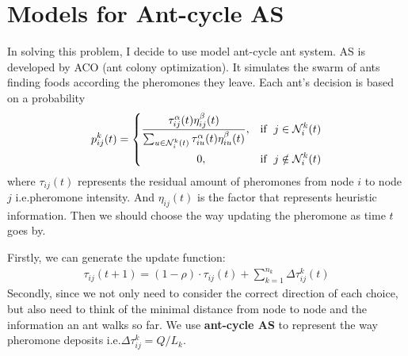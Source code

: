 \documentclass{article}
\begin{document}
\section{Models for Ant-cycle AS}
In solving this problem, I decide to use model ant-cycle ant system.
AS is developed by ACO (ant colony optimization).
It simulates the swarm of ants finding foods according the pheromones they leave.
Each ant's decision is based on a probability
\[p_{ij}^k (t) = \left\{ 
        \begin{aligned}
        &\frac{\tau_{ij}^{\alpha}(t) \eta_{ij}^{\beta}(t)}{\sum_{u\in \mathcal{N}_i^k(t)} \tau_{iu}^\alpha (t) \eta_{iu}^{\beta}(t)}, &{\rm if} \;\;j\in \mathcal{N}_i^k(t)\\
        &\qquad \qquad \quad 0, &{\rm if} \;\;j\notin  \mathcal{N}_i^k(t)
        \end{aligned} 
    \right.
\]
where $\tau_{ij}(t)$ represents the residual amount of pheromones from node $i$ to node $j$ i.e.pheromone intensity.
And  $\eta_{ij}(t)$ is the factor that represents heuristic information.
Then we should choose the way updating the pheromone as time $t$ goes by.\\
\par Firstly, we can generate the update function:
\begin{align*}
    \tau_{ij}(t+1) = (1-\rho)\cdot \tau_{ij}(t) +\sum_{k=1}^{n_k}\Delta \tau_{ij}^k(t)
\end{align*}
Secondly, since we not only need to consider the correct direction of each choice,
but also need to think of the minimal distance from node to node and the information an ant walks so far.
We use \textbf{ant-cycle AS} to represent the way pheromone deposits i.e.$\Delta \tau_{ij}^k = Q/L_k$.
\end{document}
